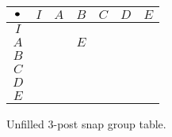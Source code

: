 \documentclass[../gatm.tex]{subfiles}
\begin{document}
\begin{figure}
\begin{center}
\begin{tabular}{C|C|C|C|C|C|C|}
$\bullet$ & $I$ & $A$ & $B$ & $C$ & $D$ & $E$ \\ \hline
$I$    &   &   &   &   &   &   \\ \hline
$A$    &   &   & $E$ &   &   &   \\ \hline
$B$    &   &   &   &   &   &   \\ \hline
$C$    &   &   &   &   &   &   \\ \hline
$D$    &   &   &   &   &   &   \\ \hline
$E$    &   &   &   &   &   &   \\ \hline
\end{tabular}
\end{center}
\caption{Unfilled $3$-post snap group table.}
\label{fig:sbstable}
\end{figure}
\end{document}
